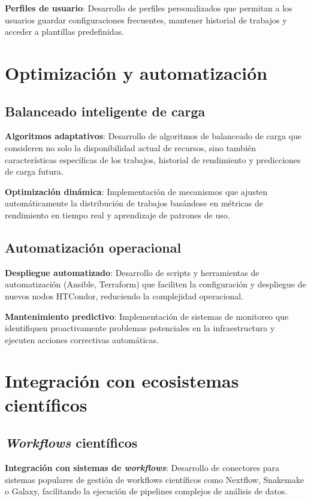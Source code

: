 \textbf{Perfiles de usuario}: Desarrollo de perfiles personalizados que permitan a los usuarios guardar configuraciones frecuentes, mantener historial de trabajos y acceder a plantillas predefinidas.

\section{Optimización y automatización}
\noindent

\subsection{Balanceado inteligente de carga}
\noindent

\textbf{Algoritmos adaptativos}: Desarrollo de algoritmos de balanceado de carga que consideren no solo la disponibilidad actual de recursos, sino también características específicas de los trabajos, historial de rendimiento y predicciones de carga futura.

\textbf{Optimización dinámica}: Implementación de mecanismos que ajusten automáticamente la distribución de trabajos basándose en métricas de rendimiento en tiempo real y aprendizaje de patrones de uso.

\subsection{Automatización operacional}
\noindent

\textbf{Despliegue automatizado}: Desarrollo de scripts y herramientas de automatización (Ansible, Terraform) que faciliten la configuración y despliegue de nuevos nodos HTCondor, reduciendo la complejidad operacional.

\textbf{Mantenimiento predictivo}: Implementación de sistemas de monitoreo que identifiquen proactivamente problemas potenciales en la infraestructura y ejecuten acciones correctivas automáticas.

\section{Integración con ecosistemas científicos}
\noindent

\subsection{\textit{Workflows} científicos}
\noindent

\textbf{Integración con sistemas de \textit{workflows}}: Desarrollo de conectores para sistemas populares de gestión de workflows científicos como Nextflow, Snakemake o Galaxy, facilitando la ejecución de pipelines complejos de análisis de datos.

